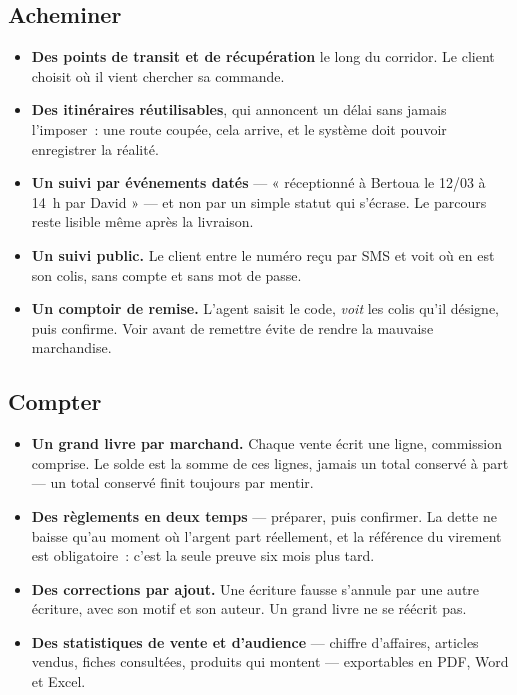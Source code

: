 \documentclass[11pt,a4paper]{article}
\begin{document}
\subsection{Acheminer}

\begin{itemize}
  \item \textbf{Des points de transit et de récupération} le long du corridor.
        Le client choisit où il vient chercher sa commande.
  \item \textbf{Des itinéraires réutilisables}, qui annoncent un délai sans
        jamais l'imposer~: une route coupée, cela arrive, et le système doit
        pouvoir enregistrer la réalité.
  \item \textbf{Un suivi par événements datés} — « réceptionné à Bertoua le
        12/03 à 14~h par David » — et non par un simple statut qui s'écrase.
        Le parcours reste lisible même après la livraison.
  \item \textbf{Un suivi public.} Le client entre le numéro reçu par SMS et
        voit où en est son colis, sans compte et sans mot de passe.
  \item \textbf{Un comptoir de remise.} L'agent saisit le code, \emph{voit}
        les colis qu'il désigne, puis confirme. Voir avant de remettre évite
        de rendre la mauvaise marchandise.
\end{itemize}

\subsection{Compter}

\begin{itemize}
  \item \textbf{Un grand livre par marchand.} Chaque vente écrit une ligne,
        commission comprise. Le solde est la somme de ces lignes, jamais un
        total conservé à part — un total conservé finit toujours par mentir.
  \item \textbf{Des règlements en deux temps} — préparer, puis confirmer. La
        dette ne baisse qu'au moment où l'argent part réellement, et la
        référence du virement est obligatoire~: c'est la seule preuve six mois
        plus tard.
  \item \textbf{Des corrections par ajout.} Une écriture fausse s'annule par
        une autre écriture, avec son motif et son auteur. Un grand livre ne se
        réécrit pas.
  \item \textbf{Des statistiques de vente et d'audience} — chiffre d'affaires,
        articles vendus, fiches consultées, produits qui montent — exportables
        en PDF, Word et Excel.
\end{itemize}
\end{document}
